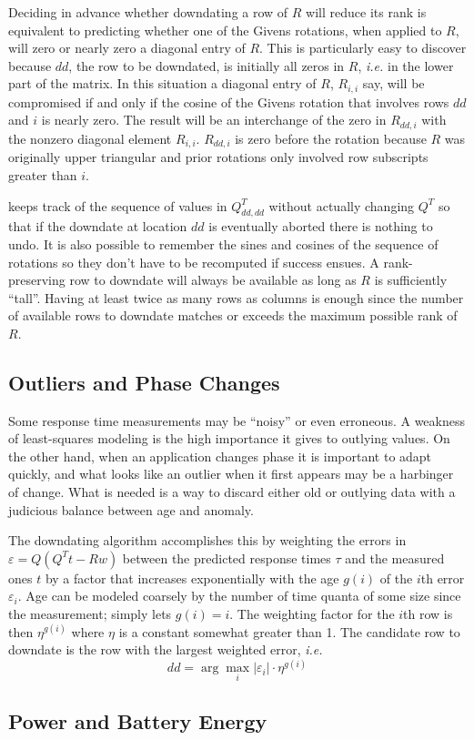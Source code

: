 Deciding in advance whether downdating a row of $R$ will reduce its rank
is equivalent to predicting whether one of the Givens rotations, when applied to $R$,
will zero or nearly zero a diagonal entry of $R$.
This is particularly easy to discover because $dd$, the row to be downdated, is initially all zeros in $R$,
\emph{i.e.} in the lower part of the matrix.
In this situation a diagonal entry of $R$, $R_{i,i}$ say, will be compromised if and only if the
cosine of the Givens rotation that involves rows $dd$ and $i$ is nearly zero.
The result will be an interchange of the zero in $R_{dd,i}$ with the nonzero diagonal element $R_{i,i}$.
$R_{dd,i}$ is zero before the rotation because
$R$ was originally upper triangular and prior rotations only involved row subscripts greater than $i$.

\pacora keeps track of the sequence of values in $Q^T_{dd,dd}$ without actually changing $Q^T$
so that if the downdate at location $dd$ is eventually aborted there is nothing to undo.
It is also possible to remember the sines and cosines of the sequence of rotations
so they don't have to be recomputed if success ensues.
A rank-preserving row to downdate will always be available as long as $R$ is sufficiently ``tall''.
Having at least twice as many rows as columns is enough since the number of available rows to downdate
matches or exceeds the maximum possible rank of $R$.

\subsection*{Outliers and Phase Changes}

Some response time measurements may be ``noisy'' or even erroneous.
A weakness of least-squares modeling is the high importance it gives to outlying values.
On the other hand, when an application changes phase it is important to adapt quickly,
and what looks like an outlier when it first appears may be a harbinger of change.
What is needed is a way to discard either old or outlying data
with a judicious balance between age and anomaly.

The downdating algorithm accomplishes this by weighting the errors in $\varepsilon = Q(Q^Tt - Rw)$
between the predicted response times $\tau$ and the measured ones $t$ by a factor
that increases exponentially with the age $g(i)$ of the $i$th error $\varepsilon_i$.
Age can be modeled coarsely by the number of time quanta of some size since the measurement;
\pacora simply lets $g(i) = i$.
The weighting factor for the $i$th row is then $\eta^{g(i)}$ where $\eta$ is a constant somewhat greater than 1.
The candidate row to downdate is the row with the largest weighted error, \emph{i.e.}
\begin{displaymath}
dd = \arg\max_i |\varepsilon_i| \cdot \eta^{g(i)}
\end{displaymath}

\subsection*{Power and Battery Energy}




